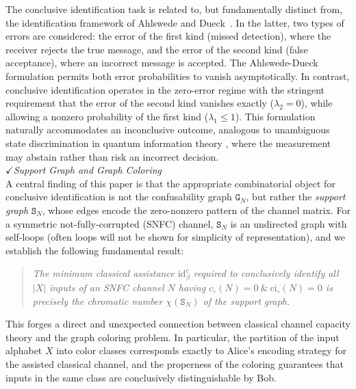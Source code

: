 \documentclass[12pt,a4paper]{article}
\begin{document}
\noindent The conclusive identification task is related to, but fundamentally distinct from, the identification framework of Ahlswede and Dueck~\cite{Ahlswede1989-1}. In the latter, two types of errors are considered: the error of the first kind (missed detection), where the receiver rejects the true message, and the error of the second kind (false acceptance), where an incorrect message is accepted. The Ahlswede-Dueck formulation permits both error probabilities to vanish asymptotically. In contrast, conclusive identification operates in the zero-error regime with the stringent requirement that the error of the second kind vanishes exactly ($\lambda_2 = 0$), while allowing a nonzero probability of the first kind ($\lambda_1 \leq 1$). This formulation naturally accommodates an inconclusive outcome, analogous to unambiguous state discrimination in quantum information theory \cite{Chefles2000,Barnett2009,Bae2015}, where the measurement may abstain rather than risk an incorrect decision.\\

\noindent$\checkmark${\it Support Graph and Graph Coloring}\vspace{-.3cm}\\

\noindent A central finding of this paper is that the appropriate combinatorial object for conclusive identification is not the confusability graph $\mathtt{G}_N$, but rather the \emph{support graph} $\mathtt{S}_N$, whose edges encode the zero-nonzero pattern of the channel matrix. For a symmetric not-fully-corrupted (SNFC) channel, $\mathtt{S}_N$ is an undirected graph with self-loops (often loops will not be shown for simplicity of representation), and we establish the following fundamental result:

\begin{quote}
\emph{The minimum classical assistance $\mathrm{id}^c_\beta$ required to conclusively identify all $|X|$ inputs of an SNFC channel $N$ having $c_\circ(N)=0~\&~\mathrm{ci}_\circ(N)=0$ is precisely the chromatic number $\chi(\mathtt{S}_N)$ of the support graph.}
\end{quote}

\noindent This forges a direct and unexpected connection between classical channel capacity theory and the graph coloring problem. In particular, the partition of the input alphabet $X$ into color classes corresponds exactly to Alice's encoding strategy for the assisted classical channel, and the properness of the coloring guarantees that inputs in the same class are conclusively distinguishable by Bob.\\
\end{document}
